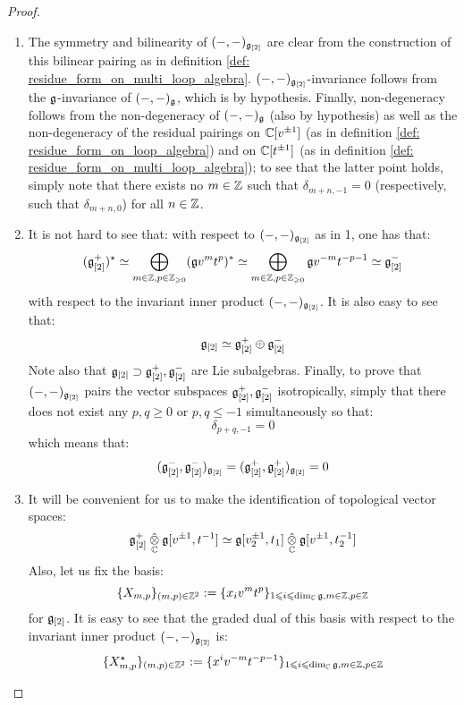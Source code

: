                 \begin{proof}
                    \begin{enumerate}
                        \item The symmetry and bilinearity of $(-, -)_{\mathfrak{g}_{[2]}}$ are clear from the construction of this bilinear pairing as in definition \ref{def: residue_form_on_multi_loop_algebra}. $(-, -)_{\mathfrak{g}_{[2]}}$-invariance follows from the $\mathfrak{g}$-invariance of $(-, -)_{\mathfrak{g}}$, which is by hypothesis. Finally, non-degeneracy follows from the non-degeneracy of $(-, -)_{\mathfrak{g}}$ (also by hypothesis) as well as the non-degeneracy of the residual pairings on $\mathbb{C}[v^{\pm 1}]$ (as in definition \ref{def: residue_form_on_loop_algebra}) and on $\mathbb{C}[t^{\pm 1}]$ (as in definition \ref{def: residue_form_on_multi_loop_algebra}); to see that the latter point holds, simply note that there exists no $m \in \mathbb{Z}$ such that $\delta_{m + n, - 1} = 0$ (respectively, such that $\delta_{m + n, 0}$) for all $n \in \mathbb{Z}$.
                        \item It is not hard to see that: with respect to $(-, -)_{\mathfrak{g}_{[2]}}$ as in 1, one has that:
                            $$(\mathfrak{g}_{[2]}^+)^{\star} \simeq \bigoplus_{m \in \mathbb{Z}, p \in \mathbb{Z}_{\geqslant 0}} (\mathfrak{g} v^m t^p)^* \simeq \bigoplus_{m \in \mathbb{Z}, p \in \mathbb{Z}_{\geqslant 0}} \mathfrak{g} v^{-m} t^{-p - 1} \simeq \mathfrak{g}_{[2]}^-$$
                        with respect to the invariant inner product $(-, -)_{\mathfrak{g}_{[2]}}$. It is also easy to see that:
                            $$\mathfrak{g}_{[2]} \simeq \mathfrak{g}_{[2]}^+ \oplus \mathfrak{g}_{[2]}^-$$
                        Note also that $\mathfrak{g}_{[2]} \supset \mathfrak{g}_{[2]}^+, \mathfrak{g}_{[2]}^-$ are Lie subalgebras. Finally, to prove that $(-, -)_{\mathfrak{g}_{[2]}}$ pairs the vector subspaces $\mathfrak{g}_{[2]}^+, \mathfrak{g}_{[2]}^-$ isotropically, simply that there does not exist any $p, q \geq 0$ or $p, q \leq -1$ simultaneously so that:
                            $$\delta_{p + q, -1} = 0$$
                        which means that:
                            $$(\mathfrak{g}_{[2]}^-, \mathfrak{g}_{[2]}^-)_{\mathfrak{g}_{[2]}} = (\mathfrak{g}_{[2]}^+, \mathfrak{g}_{[2]}^+)_{\mathfrak{g}_{[2]}} = 0$$
                        \item It will be convenient for us to make the identification of topological vector spaces:
                            $$\g_{[2]}^+ \hattensor_{\bbC} \g[v^{\pm 1}, t^{-1}] \cong \g[v_2^{\pm 1}, t_1] \hattensor_{\bbC} \g[v^{\pm 1}, t_2^{-1}]$$
                        Also, let us fix the basis:
                            $$\{X_{m, p}\}_{(m, p) \in \mathbb{Z}^2} := \{x_i v^m t^p\}_{1 \leqslant i \leqslant \dim_{\mathbb{C}} \mathfrak{g}, m \in \mathbb{Z}, p \in \mathbb{Z}}$$
                        for $\mathfrak{g}_{[2]}$. It is easy to see that the graded dual of this basis with respect to the invariant inner product $(-, -)_{\mathfrak{g}_{[2]}}$ is:
                            $$\{X_{m, p}^{\star}\}_{(m, p) \in \mathbb{Z}^2} := \{x^i v^{-m} t^{-p - 1}\}_{1 \leqslant i \leqslant \dim_{\mathbb{C}} \mathfrak{g}, m \in \mathbb{Z}, p \in \mathbb{Z}}$$
                        

\end{enumerate}
\end{proof}
